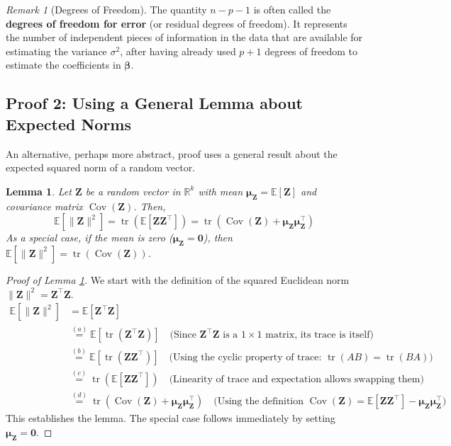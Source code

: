 \documentclass[11pt, letterpaper]{article}
\theoremstyle{definition}
\theoremstyle{plain} %
\newtheorem{lemma}[definition]{Lemma}
\theoremstyle{remark}
\newtheorem{remark}[definition]{Remark}     %
\newcommand{\E}{\mathbb{E}}            %
\newcommand{\Cov}{\operatorname{Cov}}  %
\newcommand{\tr}{\operatorname{tr}}    %
\newcommand{\vb}[1]{\bm{#1}}          %
\newcommand{\betavec}{\vb{\beta}}     %
\newcommand{\muvec}{\vb{\mu}}        %
\newcommand{\zerovec}{\vb{0}}        %
\newcommand{\Zvec}{\vb{Z}}            %
\begin{document}
\begin{remark}[Degrees of Freedom]
The quantity $n - p - 1$ is often called the \textbf{degrees of freedom for error} (or residual degrees of freedom). It represents the number of independent pieces of information in the data that are available for estimating the variance $\sigma^2$, after having already used $p+1$ degrees of freedom to estimate the coefficients in $\betavec$.
\end{remark}

\subsection{Proof 2: Using a General Lemma about Expected Norms}

An alternative, perhaps more abstract, proof uses a general result about the expected squared norm of a random vector.

\begin{lemma} \label{lemma:expected_norm}
Let $\Zvec$ be a random vector in $\mathbb{R}^k$ with mean $\muvec_{\Zvec} = \E[\Zvec]$ and covariance matrix $\Cov(\Zvec)$. Then,
\[
\E[\|\Zvec\|^2] = \tr(\E[\Zvec \Zvec^\top]) = \tr(\Cov(\Zvec) + \muvec_{\Zvec} \muvec_{\Zvec}^\top)
\]
As a special case, if the mean is zero ($\muvec_{\Zvec} = \zerovec$), then $\E[\|\Zvec\|^2] = \tr(\Cov(\Zvec))$.
\end{lemma}

\begin{proof}[Proof of Lemma \ref{lemma:expected_norm}]
We start with the definition of the squared Euclidean norm $\|\Zvec\|^2 = \Zvec^\top \Zvec$.
\begin{align*}
\E[\|\Zvec\|^2] &= \E[\Zvec^\top \Zvec] \\
&\overset{(a)}{=} \E[\tr(\Zvec^\top \Zvec)] \quad \text{(Since } \Zvec^\top \Zvec \text{ is a } 1 \times 1 \text{ matrix, its trace is itself)} \\
&\overset{(b)}{=} \E[\tr(\Zvec \Zvec^\top)] \quad \text{(Using the cyclic property of trace: } \tr(AB) = \tr(BA)\text{)} \\
&\overset{(c)}{=} \tr(\E[\Zvec \Zvec^\top]) \quad \text{(Linearity of trace and expectation allows swapping them)} \\
&\overset{(d)}{=} \tr(\Cov(\Zvec) + \muvec_{\Zvec} \muvec_{\Zvec}^\top) \quad \text{(Using the definition } \Cov(\Zvec) = \E[\Zvec \Zvec^\top] - \muvec_{\Zvec} \muvec_{\Zvec}^\top\text{)}
\end{align*}
This establishes the lemma. The special case follows immediately by setting $\muvec_{\Zvec} = \zerovec$.
\end{proof}
\end{document}
